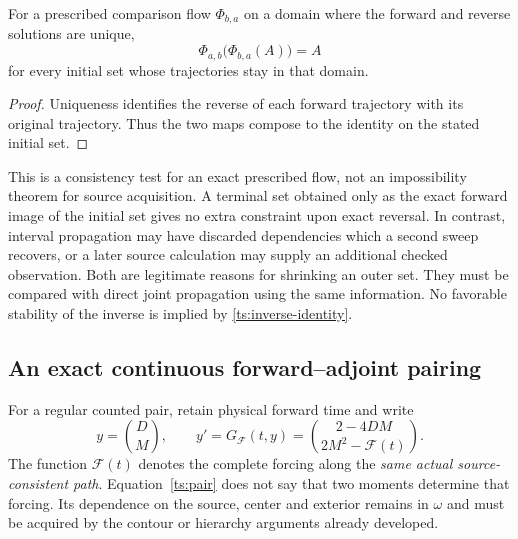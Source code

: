 \begin{proposition}\label{ts:inverse}
For a prescribed comparison flow $\Phi_{b,a}$ on a domain where the
forward and reverse solutions are unique,
\begin{equation}
 \Phi_{a,b}\bigl(\Phi_{b,a}(A)\bigr)=A
 \label{ts:inverse-identity}
\end{equation}
for every initial set whose trajectories stay in that domain.
\end{proposition}

\begin{proof}
Uniqueness identifies the reverse of each forward trajectory with its
original trajectory. Thus the two maps compose to the identity on the
stated initial set.
\end{proof}

This is a consistency test for an exact prescribed flow, not an
impossibility theorem for source acquisition. A terminal set obtained
only as the exact forward image of the initial set gives no extra
constraint upon exact reversal. In contrast, interval propagation may
have discarded dependencies which a second sweep recovers, or a later
source calculation may supply an additional checked observation.
Both are legitimate reasons for shrinking an outer set. They must be
compared with direct joint propagation using the same information.
No favorable stability of the inverse is implied by
\eqref{ts:inverse-identity}.

\subsection{An exact continuous forward--adjoint pairing}

For a regular counted pair, retain physical forward time and write
\begin{equation}
 y=\binom D M,\qquad
 y'=G_{\mathcal F}(t,y)
   =\binom{2-4DM}{2M^2-\mathcal F(t)}.
 \label{ts:pair}
\end{equation}
The function $\mathcal F(t)$ denotes the complete forcing along the
\emph{same actual source-consistent path}. Equation~\eqref{ts:pair}
does not say that two moments determine that forcing. Its dependence on
the source, center and exterior remains in $\omega$ and must be acquired
by the contour or hierarchy arguments already developed.

